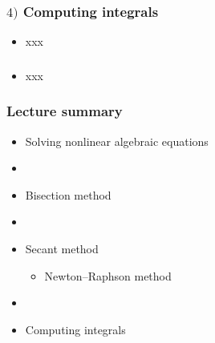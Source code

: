 \documentclass[english,14pt]{beamer}
\begin{document}

\begin{frame}[fragile]

\frametitle{$4)$ Computing integrals}

\begin{itemize}
	\item xxx
\end{itemize}

\end{frame}


\begin{frame}[fragile]

\frametitle{}

\begin{itemize}
	\item xxx
\end{itemize}

\end{frame}


\begin{frame}[fragile]

\frametitle{Lecture summary}
\begin{itemize}
	\item Solving nonlinear algebraic equations

	\item[]
	
	\item Bisection method

	\item[]
	
	\item Secant method
	\begin{itemize}
		\item Newton--Raphson method
	\end{itemize}
	
	\item[]
	
	\item Computing integrals
		
\end{itemize}

\end{frame}
\end{document}
